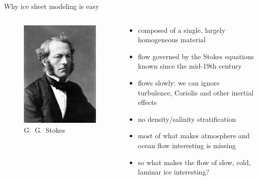 \documentclass[hide notes,intlimits]{beamer}
\begin{document}
\begin{frame}{Why ice sheet modeling is easy}
  \begin{columns}[c]
    \begin{column}{.28\linewidth}
      \begin{figure}
        \includegraphics[width=\linewidth]{ggstokes}
        \\ \scriptsize{G.~G.~Stokes}
      \end{figure}
    \end{column}
    \begin{column}{.67\linewidth}
      \begin{itemize}[<+- | alert@+>]
      \item composed of a single, largely homogeneous material
      \item flow governed by the Stokes equations known since the mid-19th century
      \item flows slowly: we can ignore turbulence, Coriolis and other inertial effects
      \item no density/salinity stratification
      \item most of what makes atmosphere and ocean flow interesting is missing
      \item so what makes the flow of slow, cold, laminar ice interesting?
      \end{itemize}
    \end{column}
  \end{columns}
\end{frame}
\end{document}
